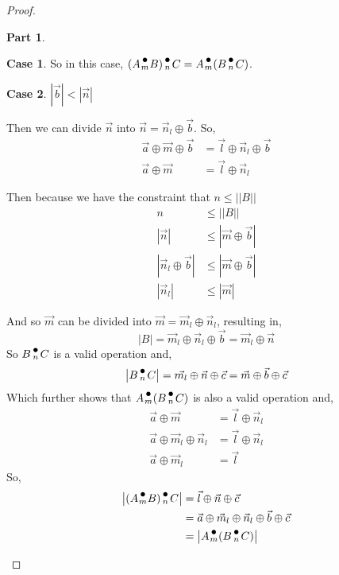 \documentclass[12pt]{book}
\theoremstyle{plain}
\theoremstyle{definition}
\theoremstyle{ppart}
\newtheorem{ppart}{Part}
\theoremstyle{case}
\newtheorem{case}{Case}
\theoremstyle{solution}
\newcommand{\dmult}[1]{\text{\raisebox{1ex}{$\underset{#1}{\,\bullet\,}$}}}
\newcommand{\shape}[1]{\left|#1\right|}
\begin{document}
\begin{proof}
\begin{ppart}
\begin{case}
So in this case, $(A \dmult{m} B) \dmult{n} C = A \dmult{m} (B \dmult{n} C)$.
\end{case}
\begin{case} $\shape{\vec{b}} < \shape{\vec{n}}$

Then we can divide $\vec{n}$ into $\vec{n} = \vec{n}_l \oplus \vec{b}$.
So,
\begin{align*}
  \vec{a} \oplus \vec{m} \oplus \vec{b} &= \vec{l} \oplus \vec{n}_l \oplus \vec{b} \\
  \vec{a} \oplus \vec{m} &= \vec{l} \oplus \vec{n}_l
\end{align*}

Then because we have the constraint that $n \le \shape{\shape{B}}$
\begin{align*}
  n &\le \shape{\shape{B}} \\
  \shape{\vec{n}} &\le \shape{\vec{m} \oplus \vec{b}} \\
  \shape{\vec{n}_l \oplus \vec{b}} &\le \shape{\vec{m} \oplus \vec{b}} \\
  \shape{\vec{n}_l} &\le \shape{\vec{m}}
\end{align*}

And so $\vec{m}$ can be divided into $\vec{m} = \vec{m}_l \oplus \vec{n}_l$,
resulting in,
\[ \shape{B} = \vec{m}_l \oplus \vec{n}_l \oplus \vec{b} = \vec{m}_l \oplus \vec{n} \]
So $B \dmult{n} C$ is a valid operation and,
\[ \shape{B \dmult{n} C} = \vec{m_l} \oplus \vec{n} \oplus \vec{c} = \vec{m} \oplus \vec{b} \oplus \vec{c} \]
Which further shows that $A \dmult{m} (B \dmult{n} C)$ is also a valid operation and,
\begin{align*}
  \vec{a} \oplus \vec{m} &= \vec{l} \oplus \vec{n}_l \\
  \vec{a} \oplus \vec{m}_l \oplus \vec{n}_l &= \vec{l} \oplus \vec{n}_l \\
  \vec{a} \oplus \vec{m}_l &= \vec{l}
\end{align*}
So,
\begin{align*}
  \shape{(A \dmult{m} B) \dmult{n} C}
  &= \vec{l} \oplus \vec{n} \oplus \vec{c} \\
  &= \vec{a} \oplus \vec{m}_l \oplus \vec{n}_l \oplus \vec{b} \oplus \vec{c} \\
  &= \shape{A \dmult{m} (B \dmult{n} C)}
\end{align*}


\end{case}
\end{ppart}
\end{proof}
\end{document}
